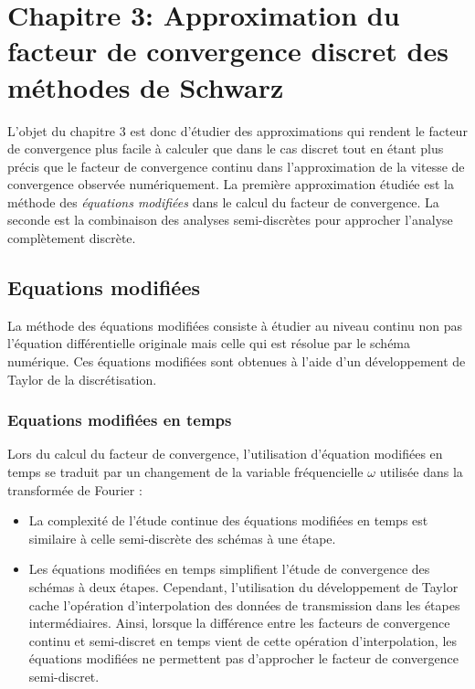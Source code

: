 \section*{Chapitre 3: Approximation du facteur de convergence discret des méthodes de Schwarz}
 L'objet du chapitre 3 est donc d'étudier des approximations
qui rendent le facteur de convergence plus facile à calculer
que dans le cas discret tout en étant plus précis que le facteur
de convergence continu dans l'approximation de la vitesse
de convergence observée numériquement.
La première approximation étudiée est la méthode des
\textit{équations modifiées} dans le calcul du facteur de convergence.
La seconde est la combinaison des analyses semi-discrètes
pour approcher l'analyse complètement discrète.
\subsection*{Equations modifiées}
La méthode des équations modifiées consiste à étudier au niveau
continu non pas l'équation différentielle originale mais celle
qui est résolue par le schéma numérique. 
Ces équations modifiées sont obtenues à l'aide d'un développement
de Taylor de la discrétisation.
\subsubsection*{Equations modifiées en temps}
Lors du calcul du facteur de convergence, l'utilisation d'équation
modifiées en temps se traduit par un changement de la variable
fréquencielle $\omega$ utilisée dans la transformée de Fourier :
\begin{itemize}
	\item
La complexité de l'étude continue des équations modifiées en temps
est similaire à celle semi-discrète des schémas à une étape.
	\item
Les équations modifiées en temps simplifient l'étude de convergence
des schémas à deux étapes. Cependant, l'utilisation du développement
de Taylor cache l'opération d'interpolation des données de
transmission dans les étapes intermédiaires. Ainsi, lorsque la
différence entre les facteurs de convergence continu
et semi-discret en temps vient de cette opération d'interpolation,
les équations modifiées ne permettent pas d'approcher le facteur
de convergence semi-discret.
\end{itemize}
